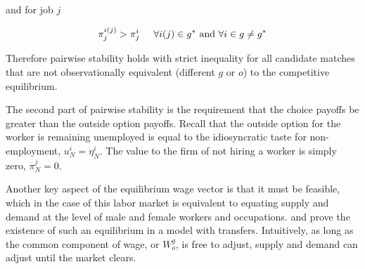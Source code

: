 \documentclass[12pt]{article}
\begin{document}
and for job $j$

$$\pi^{i(j)}_{j} > \pi^{i}_j \hspace{5mm} \forall i(j) \in g^* \text{  and  } \forall i \in g \neq g^*$$

Therefore pairwise stability holds with strict inequality for all candidate matches that are not observationally equivalent (different $g$ or $o$) to the competitive equilibrium.

The second part of pairwise stability is the requirement that the choice payoffs be greater than the outside option payoffs. Recall that the outside option for the worker is remaining unemployed is equal to the idiosyncratic taste for non-employment, $ u^i_N = \eta^i_N$. The value to the firm of not hiring a worker is simply zero, $\pi^j_N = 0$.



Another key aspect of the equilibrium wage vector is that it must be feasible, which in the case of this labor market is equivalent to equating supply and demand at the level of male and female workers and occupations.  and  prove the existence of such an equilibrium in a model with transfers. Intuitively, as long as the common component of wage, or $W^g_o$, is free to adjust, supply and demand can adjust until the market clears. 





\end{document}
